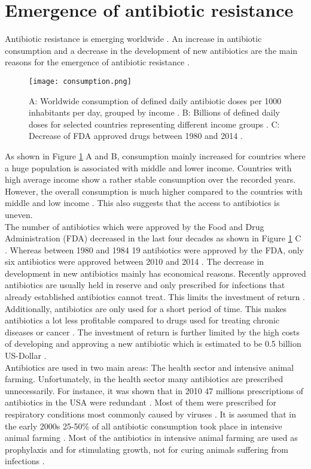 \section{Emergence of antibiotic resistance}
Antibiotic resistance is emerging worldwide \cite{ventola_antibiotic_2015}. An increase in antibiotic consumption and a decrease in the development of new antibiotics are the main reasons for the emergence of antibiotic resistance \cite{ventola_antibiotic_2015}. 
\begin{figure}
	\texttt{[image: consumption.png]}
	\caption{A: Worldwide consumption of defined daily antibiotic doses per 1000 inhabitants per day, grouped by income \cite{klein_global_2018}.  B: Billions of defined daily doses for selected countries representing different income groups \cite{klein_global_2018}. C: Decrease of FDA approved drugs between 1980 and 2014 \cite{ventola_antibiotic_2015}.}
	\label{figure:emergence}
\end{figure}
As shown in Figure \ref{figure:emergence} A and B, consumption mainly increased for countries where a huge population is associated with middle and lower income. Countries with high average income show a rather stable consumption over the recorded years. However, the overall consumption is much higher compared to the countries with middle and low income \cite{klein_global_2018}. This also suggests that the access to antibiotics is uneven.\\
The number of antibiotics which were approved by the Food and Drug  Administration (FDA) decreased in the last four decades as shown in Figure \ref{figure:emergence} C \cite{ventola_antibiotic_2015}. Whereas between 1980 and 1984 19 antibiotics were approved by the FDA, only six antibiotics were approved between 2010 and 2014 \cite{ventola_antibiotic_2015}. The decrease in development in new antibiotics mainly has economical reasons. Recently approved antibiotics are usually held in reserve and only prescribed for infections that already established antibiotics cannot treat. This limits the investment of return \cite{fair_antibiotics_2014}. Additionally, antibiotics are only used for a short period of time. This makes antibiotics a lot less profitable compared to drugs used for treating chronic diseases or cancer \cite{fair_antibiotics_2014}. The investment of return is further limited by the high costs of developing and approving a new antibiotic which is estimated to be 0.5 billion US-Dollar \cite{costs}. \\
Antibiotics are used in two main areas: The health sector and intensive animal farming. Unfortunately, in the health sector many antibiotics are prescribed unnecessarily. For instance, it was shown that in 2010 47 millions prescriptions of antibiotics in the USA were redundant \cite{noauthor_antibiotic_2019}. Most of them were prescribed for respiratory conditions most commonly caused by viruses \cite{noauthor_antibiotic_2019}. It is assumed that in the early 2000s 25-50\% of all antibiotic consumption took place in intensive animal farming  \cite{palumbi_humans_2001}. Most of the antibiotics in intensive animal farming are used as prophylaxis and for stimulating growth, not for curing animals suffering from infections \cite{palumbi_humans_2001}\cite{zhu_diverse_2013}.
